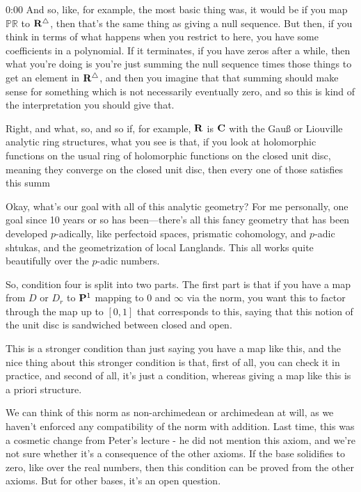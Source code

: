 \begin{unfinished}{0:00}
And so, like, for example, the most basic thing was, it would be if you map $\mathbb{PR}$ to $\R^\triangle$, then that's the same thing as giving a null sequence. But then, if you think in terms of what happens when you restrict to here, you have some coefficients in a polynomial. If it terminates, if you have zeros after a while, then what you're doing is you're just summing the null sequence times those things to get an element in $\R^\triangle$, and then you imagine that that summing should make sense for something which is not necessarily eventually zero, and so this is kind of the interpretation you should give that.

Right, and what, so, and so if, for example, $\R$ is $\C$ with the Gauß or Liouville analytic ring structures, what you see is that, if you look at holomorphic functions on the usual ring of holomorphic functions on the closed unit disc, meaning they converge on the closed unit disc, then every one of those satisfies this summ

Okay, what's our goal with all of this analytic geometry? For me personally, one goal since 10 years or so has been---there's all this fancy geometry that has been developed $p$-adically, like perfectoid spaces, prismatic cohomology, and $p$-adic shtukas, and the geometrization of local Langlands. This all works quite beautifully over the $p$-adic numbers.


So, condition four is split into two parts. The first part is that if you have a map from $D$ or $D_r$ to $\P^1$ mapping to $0$ and $\infty$ via the norm, you want this to factor through the map up to $[0,1]$ that corresponds to this, saying that this notion of the unit disc is sandwiched between closed and open. 


This is a stronger condition than just saying you have a map like this, and the nice thing about this stronger condition is that, first of all, you can check it in practice, and second of all, it's just a condition, whereas giving a map like this is a priori structure.

We can think of this norm as non-archimedean or archimedean at will, as we haven't enforced any compatibility of the norm with addition. Last time, this was a cosmetic change from Peter's lecture - he did not mention this axiom, and we're not sure whether it's a consequence of the other axioms. If the base solidifies to zero, like over the real numbers, then this condition can be proved from the other axioms. But for other bases, it's an open question.


\end{unfinished}
